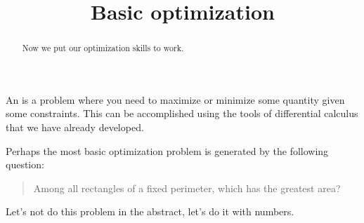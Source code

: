\documentclass{ximera}
\title[Dig-In:]{Basic optimization}
\begin{document}
\begin{abstract}
  Now we put our optimization skills to work.
\end{abstract}
\maketitle

An  is a problem where you need to maximize
or minimize some quantity given some constraints. This can be
accomplished using the tools of differential calculus that we have
already developed.

Perhaps the most basic optimization problem is generated by the
following question:

\begin{quote}
  Among all rectangles of a fixed perimeter, which has the greatest area?
\end{quote}

Let's not do this problem in the abstract, let's do it with numbers.
\end{document}
